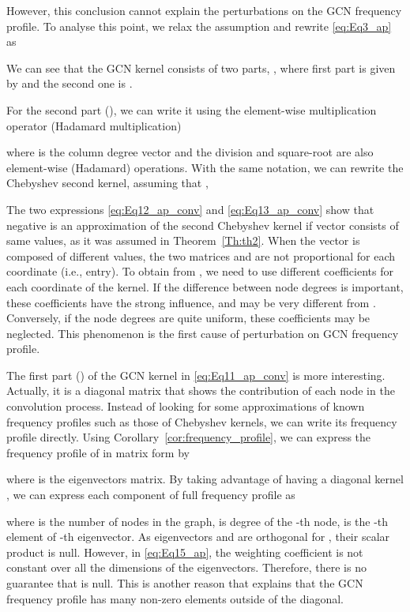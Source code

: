 \documentclass{article}
\begin{document}
However, this conclusion cannot explain the perturbations on the GCN frequency profile. To analyse this point, we relax the assumption  and rewrite \eqref{eq:Eq3_ap}  as

We can see that the GCN kernel consists of two parts, , where first part is given by  and the second one is . 

For the second part (), we can write it using the element-wise multiplication operator  (Hadamard multiplication)

where  is the column degree vector  and the division and square-root are also element-wise (Hadamard) operations. With the same notation, we can rewrite the Chebyshev second kernel, assuming that ,

The two expressions \eqref{eq:Eq12_ap_conv} and \eqref{eq:Eq13_ap_conv} show that negative  is an approximation of the second Chebyshev kernel if  vector  consists of same values, as it was assumed in Theorem~\ref{Th:th2}. When the vector  is composed of different values, the two matrices  and   are not proportional for each coordinate (i.e., entry). To obtain  from , we need to use different coefficients for each coordinate of the kernel. If the difference between node degrees is important, these coefficients have the strong influence, and  may be very different from . Conversely, if the node degrees are quite uniform, these coefficients may be neglected. This phenomenon is the first cause of perturbation on GCN frequency profile.

The first part () of the GCN kernel in \eqref{eq:Eq11_ap_conv} is more interesting. Actually, it is a diagonal matrix that shows the contribution of each node in the convolution process. Instead of looking for some approximations of known frequency profiles such as those of Chebyshev kernels, we can write its frequency profile directly. Using Corollary~\ref{cor:frequency_profile}, we can express the frequency profile of  in matrix form by

where  is the eigenvectors matrix. By taking advantage of having a diagonal kernel , we can express each component of full frequency profile as

where  is the number of nodes in the graph,  is degree of the -th node,  is the -th element of -th eigenvector. As eigenvectors  and  are orthogonal for , their scalar product is null. However, in \eqref{eq:Eq15_ap}, the weighting coefficient  is not constant over all the dimensions of the eigenvectors. Therefore, there is no guarantee that  is null. This is another reason that explains that the GCN frequency profile has many non-zero elements outside of the diagonal.
\end{document}

